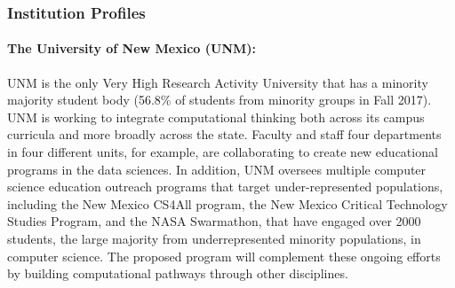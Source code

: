 \subsubsection{Institution Profiles}
\paragraph{The University of New Mexico (UNM):}

UNM is the only Very High Research Activity University that has a minority majority student body (56.8\% of students from minority groups in Fall 2017). UNM is working to integrate computational thinking both across its campus curricula and more broadly across the state. Faculty and staff four departments in four different units, for example, are collaborating to create new educational programs in the data sciences. In addition, UNM oversees multiple computer science education outreach programs that target under-represented populations, including  the New Mexico CS4All program, the New Mexico Critical Technology Studies Program, and the NASA Swarmathon, that have engaged over 2000 students, the large majority from underrepresented minority populations, in computer science. The proposed program will complement these ongoing efforts by building computational pathways through other disciplines. 

